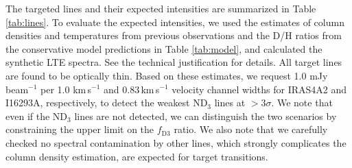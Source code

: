 \documentclass[12pt,a4paper]{article}  %
\begin{document}
\smallskip
\noindent The targeted lines and their expected intensities are summarized in Table \ref{tab:lines}. To evaluate the expected intensities, we used the estimates of column densities and temperatures from previous observations and the D/H ratios from the conservative model predictions in Table \ref{tab:model}, and calculated the synthetic LTE spectra. See the technical justification for details. 
All target lines are found to be optically thin. Based on these estimates, we request 1.0 mJy beam$^{-1}$ per 1.0 km\,s$^{-1}$ and 0.83\,km\,s$^{-1}$ velocity channel widths for IRAS4A2 and I16293A, respectively, to detect the weakest ND$_3$ lines at $>$3$\sigma$. 
We note that even if the ND$_3$ lines are not detected, we can distinguish the two scenarios by constraining the upper limit on the $f_\mathrm{D3}$ ratio. We also note that we carefully checked no spectral contamination by other lines, which strongly complicates the column density estimation, are expected for target transitions.
\end{document}
